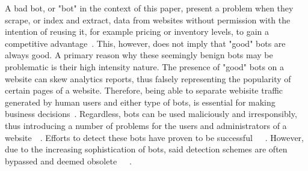 A bad bot, or "bot" in the context of this paper, present a problem when they scrape, or index and extract, data from websites without permission with the intention of reusing it, for example pricing or inventory levels, to gain a competitive advantage~\cite{bad_bot_report}.
This, however, does not imply that "good" bots are always good.
A primary reason why these seemingly benign bots may be problematic is their high intensity nature.
The presence of "good" bots on a website can skew analytics reports, thus falsely representing the popularity of certain pages of a website.
Therefore, being able to separate webisite traffic generated by human users and either type of bots, is essential for making business decisions~\cite{bad_bot_report}.
Regardless, bots can be used maliciously and irresponsibly, thus introducing a number of problems for the users and administrators of a website~\cite{1ee426975c3d46d2ba6ef5c2d76384c5}~\cite{bad_bot_report}.
Efforts to detect these bots have proven to be successful~\cite{akamai_bot_detection}~\cite{Hamidzadeh2018}~\cite{ZABIHIMAYVAN2017129}.
However, due to the increasing sophistication of bots, said detection schemes are often bypassed and deemed obsolete~\cite{ROVETTA2020102577}~\cite{STEVANOVIC2013698}~\cite{10.1109/DSN.2013.6575366}.

